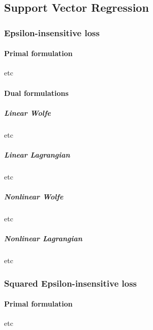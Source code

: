 



\subsection{Support Vector Regression}


\subsubsection{Epsilon-insensitive loss}

\paragraph{Primal formulation}

etc



\paragraph{Dual formulations}

\subparagraph{Linear Wolfe}

etc



\subparagraph{Linear Lagrangian}

etc



\subparagraph{Nonlinear Wolfe}

etc



\subparagraph{Nonlinear Lagrangian}

etc




\subsubsection{Squared Epsilon-insensitive loss}

\paragraph{Primal formulation}

etc



